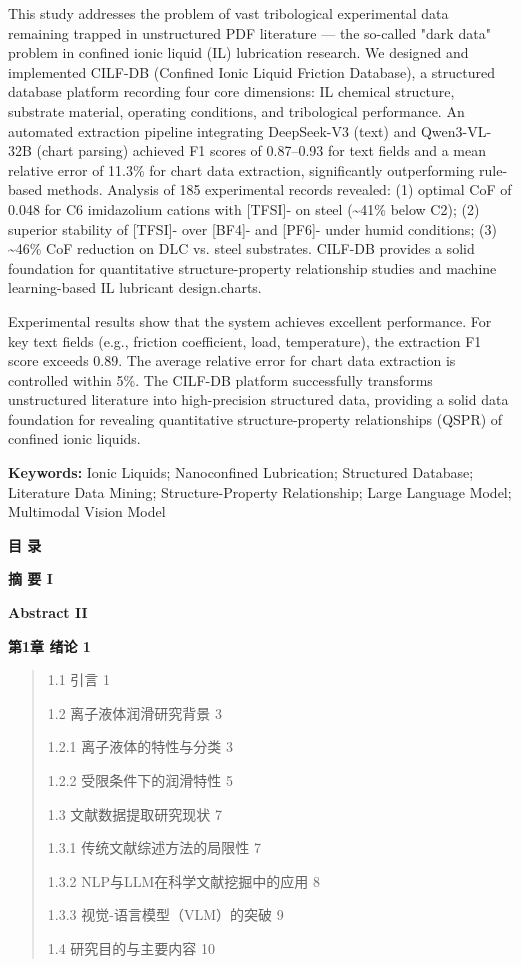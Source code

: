 This study addresses the problem of vast tribological experimental data remaining trapped in unstructured PDF literature --- the so-called "dark data" problem in confined ionic liquid (IL) lubrication research. We designed and implemented CILF-DB (Confined Ionic Liquid Friction Database), a structured database platform recording four core dimensions: IL chemical structure, substrate material, operating conditions, and tribological performance. An automated extraction pipeline integrating DeepSeek-V3 (text) and Qwen3-VL-32B (chart parsing) achieved F1 scores of 0.87--0.93 for text fields and a mean relative error of 11.3\% for chart data extraction, significantly outperforming rule-based methods. Analysis of 185 experimental records revealed: (1) optimal CoF of 0.048 for C6 imidazolium cations with {[}TFSI{]}- on steel (\textasciitilde41\% below C2); (2) superior stability of {[}TFSI{]}- over {[}BF4{]}- and {[}PF6{]}- under humid conditions; (3) \textasciitilde46\% CoF reduction on DLC vs. steel substrates. CILF-DB provides a solid foundation for quantitative structure-property relationship studies and machine learning-based IL lubricant design.charts.

Experimental results show that the system achieves excellent performance. For key text fields (e.g., friction coefficient, load, temperature), the extraction F1 score exceeds 0.89. The average relative error for chart data extraction is controlled within 5\%. The CILF-DB platform successfully transforms unstructured literature into high-precision structured data, providing a solid data foundation for revealing quantitative structure-property relationships (QSPR) of confined ionic liquids.

\textbf{Keywords:} Ionic Liquids; Nanoconfined Lubrication; Structured Database; Literature Data Mining; Structure-Property Relationship; Large Language Model; Multimodal Vision Model

\textbf{目 录}

\textbf{摘 要 I}

\textbf{Abstract II}

\textbf{第1章 绪论 1}

\begin{quote}
1.1 引言 1

1.2 离子液体润滑研究背景 3

1.2.1 离子液体的特性与分类 3

1.2.2 受限条件下的润滑特性 5

1.3 文献数据提取研究现状 7

1.3.1 传统文献综述方法的局限性 7

1.3.2 NLP与LLM在科学文献挖掘中的应用 8

1.3.3 视觉-语言模型（VLM）的突破 9

1.4 研究目的与主要内容 10
\end{quote}


